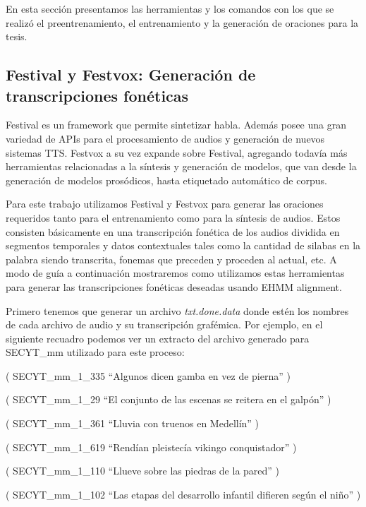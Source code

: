 En esta sección presentamos las herramientas y los comandos con los que se realizó el preentrenamiento, el entrenamiento y la generación de oraciones para la tesis.

\subsection{Festival y Festvox: Generación de transcripciones fonéticas}

Festival \cite{festivalDownload} es un framework que permite sintetizar habla. Además posee una gran variedad de APIs para el procesamiento de audios y generación de nuevos sistemas TTS. Festvox \cite{festvoxDownload} a su vez expande sobre Festival, agregando todavía más herramientas relacionadas a la síntesis y generación de modelos, que van desde la generación de modelos prosódicos, hasta etiquetado automático de corpus.

Para este trabajo utilizamos Festival y Festvox para generar las oraciones requeridos tanto para el entrenamiento como para la síntesis de audios. Estos consisten básicamente en una transcripción fonética de los audios dividida en segmentos temporales y datos contextuales tales como la cantidad de silabas en la palabra siendo transcrita, fonemas que preceden y proceden al actual, etc. A modo de guía a continuación mostraremos como utilizamos estas herramientas para generar las transcripciones fonéticas deseadas usando EHMM alignment.

Primero tenemos que generar un archivo \textit{txt.done.data} donde estén los nombres de cada archivo de audio y su transcripción grafémica. Por ejemplo, en el siguiente recuadro podemos ver un extracto del archivo generado para SECYT\_mm utilizado para este proceso:

\begin{tcolorbox}
( SECYT\_mm\_1\_335 ``Algunos dicen gamba en vez de pierna'' )

( SECYT\_mm\_1\_29 ``El conjunto de las escenas se reitera en el galpón'' )

( SECYT\_mm\_1\_361 ``Lluvia con truenos en Medellín'' )

( SECYT\_mm\_1\_619 ``Rendían pleistecía vikingo conquistador'' )

( SECYT\_mm\_1\_110 ``Llueve sobre las piedras de la pared'' )

( SECYT\_mm\_1\_102 ``Las etapas del desarrollo infantil difieren según el niño'' )

\end{tcolorbox}

